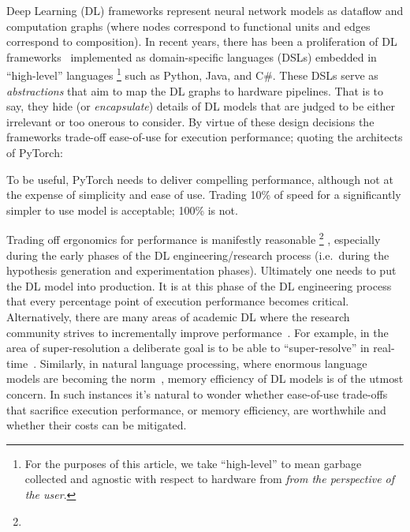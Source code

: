 Deep Learning (DL) frameworks represent neural network models as dataflow and computation graphs (where nodes correspond to functional units and edges correspond to composition).
In recent years, there has been a proliferation of DL frameworks~\cite{paszke2019pytorch,abadi2016tensorflow,chen2015mxnet,cntk} implemented as domain-specific languages (DSLs) embedded in ``high-level'' languages%
\footnote{For the purposes of this article, we take ``high-level'' to mean garbage collected and agnostic with respect to hardware from \textit{from the perspective of the user}.} such as Python, Java, and C\#.
These DSLs serve as \textit{abstractions} that aim to map the DL graphs to hardware pipelines.
That is to say, they hide (or \textit{encapsulate}) details of DL models that are judged to be either irrelevant or too onerous to consider.
By virtue of these design decisions the frameworks trade-off ease-of-use for execution performance;
quoting the architects of PyTorch:
\begin{displayquote}
  To be useful, PyTorch needs to deliver compelling performance, although not at the expense of simplicity and ease of use.
  Trading 10\% of speed for a significantly simpler to use model is acceptable; 100\% is not.
\end{displayquote}

Trading off ergonomics for performance is manifestly reasonable%
\footnote{}%
, especially during the early phases of the DL engineering/research process (i.e.\ during the hypothesis generation and experimentation phases).
Ultimately one needs to put the DL model into production.
It is at this phase of the DL engineering process that every percentage point of execution performance becomes critical.
Alternatively, there are many areas of academic DL where the research community strives to incrementally improve performance~\cite{abdelhamed2020ntire,hall2020probability,ILSVRC15}.
For example, in the area of super-resolution a deliberate goal is to be able to ``super-resolve'' in real-time~\cite{7780576}.
Similarly, in natural language processing, where enormous language models are becoming the norm~\cite{brown2020language}, memory efficiency of DL models is of the utmost concern.
In such instances it's natural to wonder whether ease-of-use trade-offs that sacrifice execution performance, or memory efficiency, are worthwhile and whether their costs can be mitigated.

